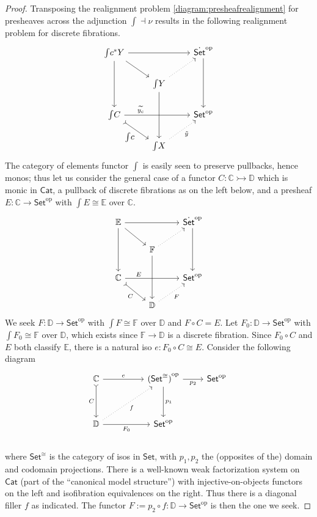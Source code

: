 \documentclass[11pt,reqno]{amsart}
\newcommand{\D}{\ensuremath{\mathbb{D}}}
\newcommand{\bbC}{\ensuremath{\mathbb{C}}}
\newcommand{\Set}{\ensuremath{\mathsf{Set}}}
\newcommand{\Cat}{\ensuremath{\mathsf{Cat}}}
\newcommand{\op}[1]{\ensuremath{{#1}^{\mathrm{op}}}}
\newcommand{\mono}{\ensuremath{\rightarrowtail}}
\renewcommand{\to}{\ensuremath{\rightarrow}}
\newcommand{\elem}[1]{\textstyle\int\!{#1}}%
\theoremstyle{remark}
\theoremstyle{definition}
\begin{document}
\begin{proof}
Transposing the realignment problem \eqref{diagram:presheafrealignment} for presheaves across the adjunction $\int\dashv \nu$ results in the following realignment problem for discrete fibrations.
\begin{equation}\label{diagram:presheafrealignment2}
\begin{tikzcd}
\elem  c^*Y \ar[dd] \ar[rd] \ar[rr] && \op{\dot{\Set}}  \ar[dd] \\
&\elem  Y \ar[dd] \ar[ru, dotted] & \\
\elem  C  \ar[rd, tail,swap, "{\elem  c}"] \ar[rr, near start, "\widetilde{y_c}"] && \op{{\Set}}   \\
& \elem  X \ar[ru, dotted, swap, "\tilde{y}"] &
\end{tikzcd}
\end{equation}
The category of elements functor $\int $ is easily seen to preserve pullbacks, hence monos; thus let us consider the general case of a functor  $C : \bbC \mono \D$ which is monic in $\Cat$, a pullback of discrete fibrations as on the left below, and a presheaf $E : \bbC \to  \op{{\Set}}$ with $\elem E \cong \mathbb{E}$ over $\bbC$. 
\begin{equation}\label{diagram:presheafrealignment3}
\begin{tikzcd}
\mathbb{E} \ar[dd] \ar[rd] \ar[rr] && \op{\dot{\Set}}  \ar[dd] \\
& \mathbb{F}  \ar[dd] \ar[ru, dotted] & \\
\bbC  \ar[rd, tail,swap, "{C}"] \ar[rr, near start, "E"] && \op{{\Set}}   \\
& \D \ar[ru, dotted, swap, "F"] &
\end{tikzcd}
\end{equation}
We seek $F : \D \to  \op{{\Set}}$ with $\elem F \cong \mathbb{F}$ over $\D$ and $F\circ C = E$.  Let $F_0 : \D \to  \op{\Set}$ with $\elem F_0 \cong \mathbb{F}$ over $\D$, which exists since $\mathbb{F}\to\D$ is a discrete fibration.  Since $F_0\circ C$ and $E$ both classify $\mathbb{E}$, there is a natural iso $e : F_0\circ C \cong E$.
Consider the following diagram
\begin{equation}\label{diagram:presheafrealignment4}
\begin{tikzcd}
\bbC \ar[dd, tail, swap, "{C}"]  \ar[rr, "e"] && {\op{(\Set^{\cong})}}  \ar[dd,"{p_1}"] \ar[r,swap,"{p_2}"] &  {\op{\Set}} \\
&&&\\
\D  \ar[rr,swap, "F_0"]  \ar[rruu, dotted, swap, "f"] && \op{\Set} &  \\
\end{tikzcd}
\end{equation}
where $\Set^{\cong}$ is the category of isos in $\Set$, with $p_1, p_2$ the (opposites of the) domain and codomain projections.  There is a well-known weak factorization system on $\Cat$ (part of the ``canonical model structure'') with injective-on-objects functors on the left and isofibration equivalences on the right.  Thus there is a diagonal filler $f$ as indicated.  The functor $F := p_2\circ f : \D \to \op{\Set}$ is then  the one we seek.
\end{proof}
\end{document}
